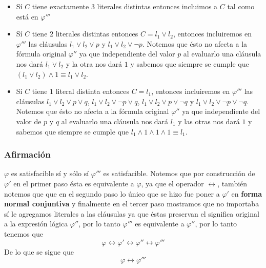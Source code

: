 \documentclass[a4paper]{article}
\begin{document}
\begin{itemize}
    \item Sí \(C\) tiene exactamente \(3\) literales distintas entonces incluimos a \(C\) tal como está en \(\varphi'''\)
    \item Sí \(C\) tiene \(2\) literales distintas entonces \(C = l_{1} \lor l_{2}\), entonces incluiremos en \(\varphi'''\)
          las cláusulas \(l_{1} \lor l_{2} \lor p\) y \(l_{1} \lor l_{2} \lor  \neg p\). Notemos que ésto no afecta a la fórmula 
          original \(\varphi''\) ya que independiente del valor \(p\) al evaluarlo una cláusula nos dará \(l_{1} \lor l_{2}\) y la otra 
          nos dará \(1\) y sabemos que siempre se cumple que \(\left(l_{1} \lor l_{2}\right) \land 1 \equiv l_{1} \lor l_{2}\).
    \item Sí \(C\) tiene \(1\) literal distinta entonces \(C = l_{1}\), entonces incluiremos en \(\varphi'''\)
          las cláusulas \(l_{1} \lor l_{2} \lor p \lor q\), \(l_{1} \lor l_{2} \lor \neg p \lor q\), \(l_{1} \lor l_{2} \lor p \lor \neg q\) 
          y \(l_{1} \lor l_{2} \lor \neg p \lor \neg q\). Notemos que ésto no afecta a la fórmula original \(\varphi''\) ya que 
          independiente del valor de \(p\) y \(q\) al evaluarlo una cláusula nos dará \(l_{1}\) y las otras nos dará \(1\) y 
          sabemos que siempre se cumple que \(l_{1} \land 1 \land 1 \land 1 \equiv l_{1}\).
\end{itemize}
\subsubsection{Afirmación}
\noindent
\(\varphi\) es satisfacible sí y sólo sí \(\varphi'''\) es satisfacible.
\newline 
Notemos que por construcción de \(\varphi'\) en el primer paso ésta es equivalente a \(\varphi\),
ya que el operador \(\longleftrightarrow\), también notemos que que en el segundo paso lo único 
que se hizo fue poner a \(\varphi'\) en \textbf{forma normal conjuntiva} y finalmente en el tercer paso
mostramos que no importaba sí le agregamos literales a las cláusulas ya que éstas preservan el significa original
a la expresión lógica \(\varphi''\), por lo tanto \(\varphi'''\) es equivalente a \(\varphi''\), por lo tanto tenemos que 
\[
    \varphi \longleftrightarrow \varphi' \longleftrightarrow \varphi'' \longleftrightarrow \varphi'''
\]
De lo que se sigue que
\[
    \varphi \longleftrightarrow \varphi'''
\]
\newpage
\end{document}
